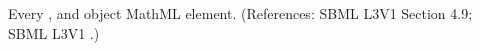 Every \AssignmentRule, \RateRule and \AlgebraicRule object
 MathML  element.  (References: SBML L3V1 Section 4.9; SBML L3V1
.)
